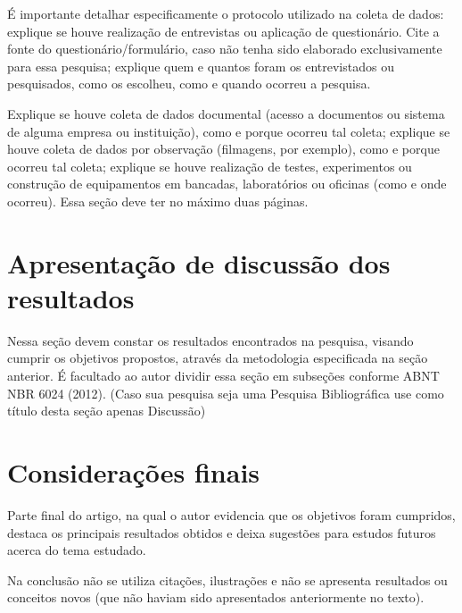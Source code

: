 \documentclass[
article,			%
11pt,				%
twoside,			%
a4paper,			%
section=TITLE,		%
onecolumn,          %
english,			%
brazil,				%
sumario=tradicional
]{abntex2}
\begin{document}
É importante detalhar especificamente o protocolo utilizado na coleta de dados: explique se houve realização de entrevistas ou aplicação de questionário. Cite a fonte do questionário/formulário, caso não tenha sido elaborado exclusivamente para essa pesquisa; explique quem e quantos foram os entrevistados ou pesquisados, como os escolheu, como e quando ocorreu a pesquisa. 

Explique se houve coleta de dados documental (acesso a documentos ou sistema de alguma empresa ou instituição), como e porque ocorreu tal coleta; explique se houve coleta de dados por observação (filmagens, por exemplo), como e porque ocorreu tal coleta; explique se houve realização de testes, experimentos ou construção de equipamentos em bancadas, laboratórios ou oficinas (como e onde ocorreu). Essa seção deve ter no máximo duas páginas.

\section{Apresentação de discussão dos resultados}
Nessa seção devem constar os resultados encontrados na pesquisa, visando cumprir os objetivos propostos, através da metodologia especificada na seção anterior. É facultado ao autor dividir essa seção em subseções conforme ABNT NBR 6024 (2012). 
(Caso sua pesquisa seja uma Pesquisa Bibliográfica use como título desta seção apenas Discussão)



    
 \section{Considerações finais}
 Parte final do artigo, na qual o autor evidencia que os objetivos foram cumpridos, destaca os principais resultados obtidos e deixa sugestões para estudos futuros acerca do tema estudado.
 
Na conclusão não se utiliza citações, ilustrações e não se apresenta resultados ou conceitos novos (que não haviam sido apresentados anteriormente no texto).

    
        
    \postextual                 %
    
\end{document}
